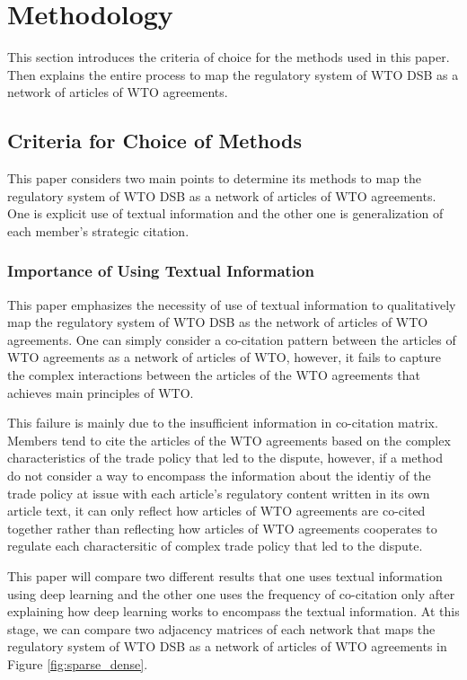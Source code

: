 \documentclass[12pt,letterpaper]{article}
\begin{document}
\section{Methodology}
This section introduces the criteria of choice for the methods used in this paper. 
Then explains the entire process
to map the regulatory system of WTO DSB as a network of articles of WTO agreements.

\subsection{Criteria for Choice of Methods}
This paper considers two main points to
determine its methods to map the regulatory system of WTO DSB
as a network of articles of WTO agreements. 
One is explicit use of textual information and the other one is
generalization of each member's strategic citation.

\subsubsection{Importance of Using Textual Information}

This paper emphasizes the necessity of use of textual information 
to qualitatively map the regulatory system of WTO DSB as the network of articles of WTO agreements.
One can simply consider a co-citation pattern between the articles of WTO agreements as a network of articles of WTO, however,
it fails to capture the complex interactions between the articles of the WTO agreements that achieves main principles of WTO.

This failure is mainly due to the insufficient information in co-citation matrix. Members tend to cite the articles of 
the WTO agreements based on the complex characteristics of 
the trade policy that led to the dispute, however, if a method 
do not consider a way to encompass the information
about the identiy of the trade policy at issue with 
each article's regulatory content written in its own article text,
it can only reflect how articles of WTO agreements are co-cited 
together rather than reflecting how articles of WTO agreements 
cooperates to regulate each charactersitic of complex trade policy that led to the dispute. 

This paper will compare two different results that one uses textual information using deep learning and the other one
uses the frequency of co-citation only after explaining how deep learning works to encompass the textual information.
At this stage, we can compare two adjacency matrices of each network that maps the regulatory system of WTO DSB as a network of articles of WTO agreements in Figure \ref{fig:sparse_dense}.
\end{document}
